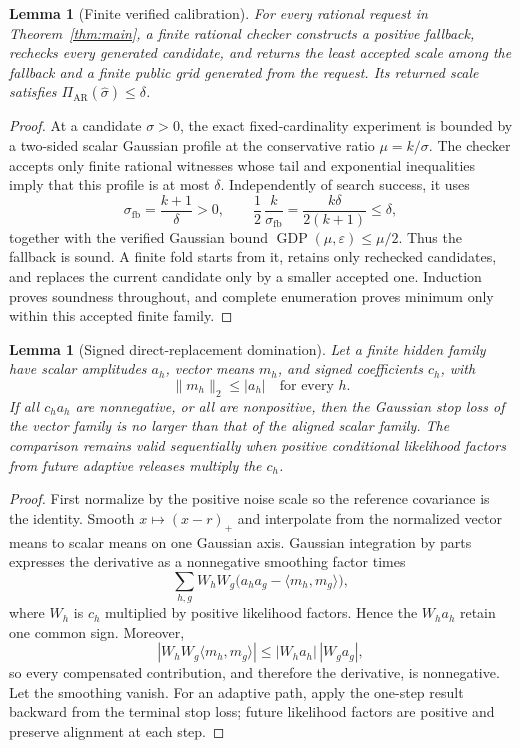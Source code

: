 \documentclass[11pt]{article}
\newtheorem{lemma}[theorem]{Lemma}
\theoremstyle{remark}
\begin{document}
\begin{lemma}[Finite verified calibration]\label{lem:finite}
For every rational request in Theorem~\ref{thm:main}, a finite rational
checker constructs a positive fallback, rechecks every generated candidate,
and returns the least accepted scale among the fallback and a finite public
grid generated from the request.  Its returned scale satisfies
$\Pi_{\mathrm{AR}}(\widehat\sigma)\leq\delta$.
\end{lemma}

\begin{proof}
At a candidate $\sigma>0$, the exact fixed-cardinality experiment is bounded
by a two-sided scalar Gaussian profile at the conservative ratio
$\mu=k/\sigma$.  The checker accepts only finite rational witnesses whose
tail and exponential inequalities imply that this profile is at most
$\delta$.  Independently of search success, it uses
\[
 \sigma_{\mathrm{fb}}=\frac{k+1}{\delta}>0,
 \qquad
 \frac12\,\frac{k}{\sigma_{\mathrm{fb}}}
 =\frac{k\delta}{2(k+1)}\leq\delta,
\]
together with the verified Gaussian bound $\operatorname{GDP}(\mu,\varepsilon)
\leq\mu/2$.  Thus the fallback is sound.  A finite fold starts from it,
retains only rechecked candidates, and replaces the current candidate only by
a smaller accepted one.  Induction proves soundness throughout, and complete
enumeration proves minimum only within this accepted finite family.
\end{proof}

\begin{lemma}[Signed direct-replacement domination]\label{lem:signed}
Let a finite hidden family have scalar amplitudes $a_h$, vector means $m_h$,
and signed coefficients $c_h$, with
\[
 \|m_h\|_2\leq|a_h|\quad\text{for every }h.
\]
If all $c_ha_h$ are nonnegative, or all are nonpositive, then the Gaussian
stop loss of the vector family is no larger than that of the aligned scalar
family.  The comparison remains valid sequentially when positive conditional
likelihood factors from future adaptive releases multiply the $c_h$.
\end{lemma}

\begin{proof}
First normalize by the positive noise scale so the reference covariance is
the identity.  Smooth $x\mapsto(x-r)_+$ and interpolate from the normalized
vector means to scalar means on one Gaussian axis.  Gaussian integration by
parts expresses the derivative as a nonnegative smoothing factor times
\[
 \sum_{h,g}W_hW_g
 \bigl(a_ha_g-\langle m_h,m_g\rangle\bigr),
\]
where $W_h$ is $c_h$ multiplied by positive likelihood factors.  Hence the
$W_ha_h$ retain one common sign.  Moreover,
\[
 |W_hW_g\langle m_h,m_g\rangle|
 \leq |W_ha_h|\,|W_ga_g|,
\]
so every compensated contribution, and therefore the derivative, is
nonnegative.  Let the smoothing vanish.  For an adaptive path, apply the
one-step result backward from the terminal stop loss; future likelihood
factors are positive and preserve alignment at each step.
\end{proof}
\end{document}

